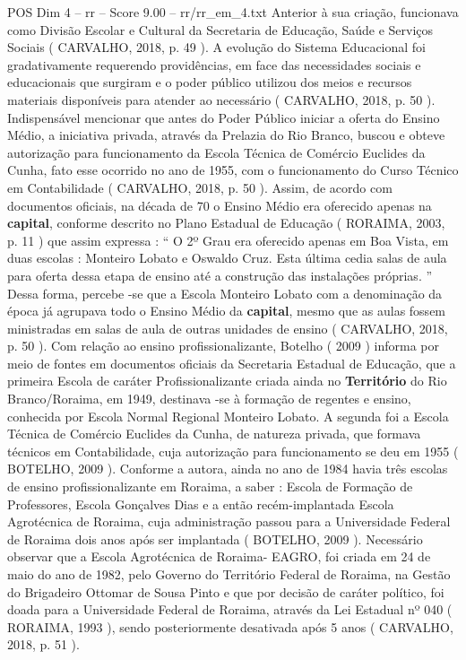 \begin{textsample}{POS Dim 4 – rr – Score 9.00 – rr/rr\_em\_4.txt}
Anterior à sua criação, funcionava como Divisão Escolar e Cultural da Secretaria de Educação, Saúde e Serviços Sociais ( CARVALHO, 2018, p. 49 ).
A evolução do Sistema Educacional foi gradativamente requerendo providências, em face das necessidades sociais e educacionais que surgiram e o poder público utilizou dos meios e recursos materiais disponíveis para atender ao necessário ( CARVALHO, 2018, p. 50 ).
Indispensável mencionar que antes do Poder Público iniciar a oferta do Ensino Médio, a iniciativa privada, através da Prelazia do Rio Branco, buscou e obteve autorização para funcionamento da Escola Técnica de Comércio Euclides da Cunha, fato esse ocorrido no ano de 1955, com o funcionamento do Curso Técnico em Contabilidade ( CARVALHO, 2018, p. 50 ).
Assim, de acordo com documentos oficiais, na década de 70 o Ensino Médio era oferecido apenas na \textbf{capital}, conforme descrito no Plano Estadual de Educação ( RORAIMA, 2003, p. 11 ) que assim expressa : “ O 2º Grau era oferecido apenas em Boa Vista, em duas escolas : Monteiro Lobato e Oswaldo Cruz.
Esta última cedia salas de aula para oferta dessa etapa de ensino até a construção das instalações próprias. ” Dessa forma, percebe -se que a Escola Monteiro Lobato com a denominação da época já agrupava todo o Ensino Médio da \textbf{capital}, mesmo que as aulas fossem ministradas em salas de aula de outras unidades de ensino ( CARVALHO, 2018, p. 50 ).
Com relação ao ensino profissionalizante, Botelho ( 2009 ) informa por meio de fontes em documentos oficiais da Secretaria Estadual de Educação, que a primeira Escola de caráter Profissionalizante criada ainda no \textbf{Território} do Rio Branco/Roraima, em 1949, destinava -se à formação de regentes e ensino, conhecida por Escola Normal Regional Monteiro Lobato.
A segunda foi a Escola Técnica de Comércio Euclides da Cunha, de natureza privada, que formava técnicos em Contabilidade, cuja autorização para funcionamento se deu em 1955 ( BOTELHO, 2009 ).
Conforme a autora, ainda no ano de 1984 havia três escolas de ensino profissionalizante em Roraima, a saber : Escola de Formação de Professores, Escola Gonçalves Dias e a então recém-implantada Escola Agrotécnica de Roraima, cuja administração passou para a Universidade Federal de Roraima dois anos após ser implantada ( BOTELHO, 2009 ).
Necessário observar que a Escola Agrotécnica de Roraima- EAGRO, foi criada em 24 de maio do ano de 1982, pelo Governo do Território Federal de Roraima, na Gestão do Brigadeiro Ottomar de Sousa Pinto e que por decisão de caráter político, foi doada para a Universidade Federal de Roraima, através da Lei Estadual nº 040 ( RORAIMA, 1993 ), sendo posteriormente desativada após 5 anos ( CARVALHO, 2018, p. 51 ).

\end{textsample}

